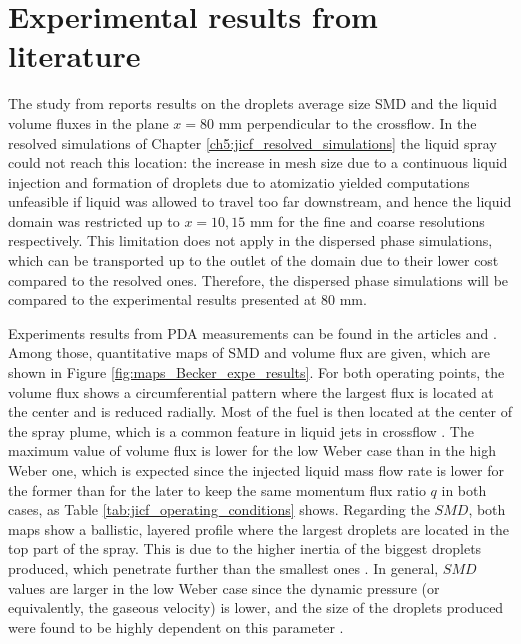 \section{Experimental results from literature}
\label{sec:ch6_experimental_results}

The study from  reports results on the droplets average size SMD and the liquid volume fluxes in the plane $x = 80$  mm perpendicular to the crossflow. In the resolved simulations of Chapter \ref{ch5:jicf_resolved_simulations} the liquid spray could not reach this location: the increase in mesh size due to a continuous liquid injection and formation of droplets due to atomizatio yielded computations unfeasible if liquid was allowed to travel too far downstream, and hence the liquid domain was restricted up to $x = 10, 15$ mm for the fine and coarse resolutions respectively. This limitation does not apply in the dispersed phase simulations, which can be transported up to the outlet of the domain due to their lower cost compared to the resolved ones. Therefore, the dispersed phase simulations will be compared to the experimental results presented at 80 mm.

Experiments results from PDA measurements can be found in the articles  and . Among those, quantitative maps of SMD and volume flux are given, which are shown in Figure \ref{fig:maps_Becker_expe_results}. For both operating points, the volume flux shows a circumferential pattern where the largest flux is located at the center and is reduced radially. Most of the fuel is then located at the center of the spray plume, which is a common feature in liquid jets in crossflow \citepColor[wu_spray_1998]. The maximum value of volume flux is lower for the low Weber case than in the high Weber one, which is expected since the injected liquid mass flow rate is lower for the former than for the later to keep the same momentum flux ratio $q$ in both cases, as Table \ref{tab:jicf_operating_conditions} shows. Regarding the $SMD$, both maps show a ballistic, layered profile where the largest droplets are located in the top part of the spray. This is due to the higher inertia of the biggest droplets produced, which penetrate further than the smallest ones \citepColor[wu_breakup_1997]. In general, $SMD$ values are larger in the low Weber case since the dynamic pressure (or equivalently, the gaseous velocity) is lower, and the size of the droplets produced were found to be highly dependent on this parameter .


